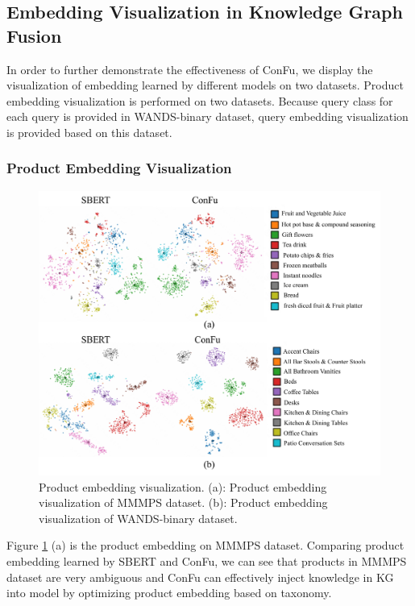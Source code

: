 \subsection{Embedding Visualization in Knowledge Graph Fusion}

In order to further demonstrate the effectiveness of ConFu, we display the visualization of embedding learned by different models on two datasets. Product embedding visualization is performed on two datasets. Because query class for each query is provided in WANDS-binary dataset, query embedding visualization is provided based on this dataset. 

\subsubsection{Product Embedding Visualization}

\begin{figure}[th] \centering
  \centering
  \includegraphics[width=\columnwidth]{product_vis_4}
  \caption{Product embedding visualization. (a): Product embedding visualization of MMMPS dataset. (b): Product embedding visualization of WANDS-binary dataset.}
  \label{product_vis}
\end{figure}

Figure \ref{product_vis} (a) is the product embedding on MMMPS dataset. Comparing product embedding learned by SBERT and ConFu, we can see that products in MMMPS dataset are very ambiguous and ConFu can effectively inject knowledge in KG into model by optimizing product embedding based on taxonomy. 

